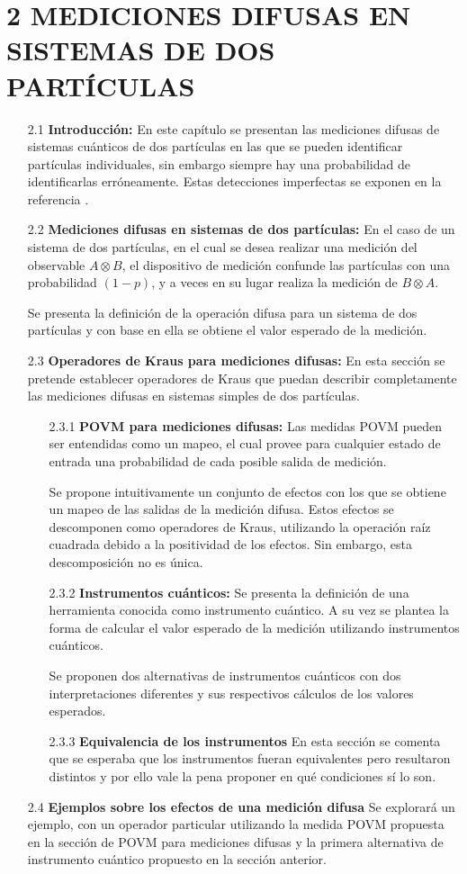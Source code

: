 \documentclass[12pt,oneside]{book}\raggedbottom{} %
\begin{document}
\begin{sloppypar}
{{\section*{2 MEDICIONES DIFUSAS EN SISTEMAS DE DOS PARTÍCULAS}
\begin{itemize}
\item[2.1] \textbf{Introducción:} En este capítulo se presentan las mediciones difusas de sistemas cuánticos de dos partículas en las que se pueden identificar partículas individuales, sin embargo siempre hay una probabilidad de identificarlas erróneamente. Estas detecciones imperfectas se exponen en la referencia {\cite{Pineda_2021}}. 
\item[2.2] \textbf{Mediciones difusas en sistemas de dos partículas:}
En el caso de un sistema de dos partículas, en el cual se desea realizar una medición del observable $A\otimes B$, el dispositivo de medición confunde las partículas con una probabilidad $(1-p)$, y a veces en su lugar realiza la medición de $B\otimes A$. 

Se presenta la definición de la operación difusa para un sistema de dos partículas y con base en ella se obtiene el valor esperado de la medición. 
\item[2.3] \textbf{Operadores de Kraus para mediciones difusas:} En esta sección se pretende establecer operadores de Kraus que puedan describir completamente las mediciones difusas en sistemas simples de dos partículas.
\begin{itemize}
  \item[2.3.1] \textbf{POVM para mediciones difusas:} 
  Las medidas POVM pueden ser entendidas como un mapeo, el cual provee para cualquier estado de entrada una probabilidad de cada posible salida de medición. 
  
  Se propone intuitivamente un conjunto de efectos con los que se obtiene un mapeo de las salidas de la medición difusa. Estos efectos se descomponen como operadores de Kraus, utilizando la operación raíz cuadrada debido a la positividad de los efectos. Sin embargo, esta descomposición no es única.
  \item[2.3.2] \textbf{Instrumentos cuánticos:} Se presenta la definición de una herramienta conocida como instrumento cuántico. A su vez se plantea la forma de calcular el valor esperado de la medición utilizando instrumentos cuánticos. 
  
  Se proponen dos alternativas  de instrumentos cuánticos con dos interpretaciones diferentes y sus respectivos cálculos de los valores esperados.
  \item[2.3.3] \textbf{Equivalencia de los instrumentos} En esta sección se comenta que se esperaba que los instrumentos fueran equivalentes pero resultaron distintos y por ello vale la pena proponer en qué condiciones sí lo son.
\end{itemize}
\item[2.4] \textbf{Ejemplos sobre los efectos de una medición difusa}
Se explorará un ejemplo, con un operador particular utilizando la medida POVM propuesta en la sección de POVM para mediciones difusas y la primera alternativa de instrumento cuántico propuesto en la sección anterior.
\end{itemize}
}}
\end{sloppypar}
\end{document}
